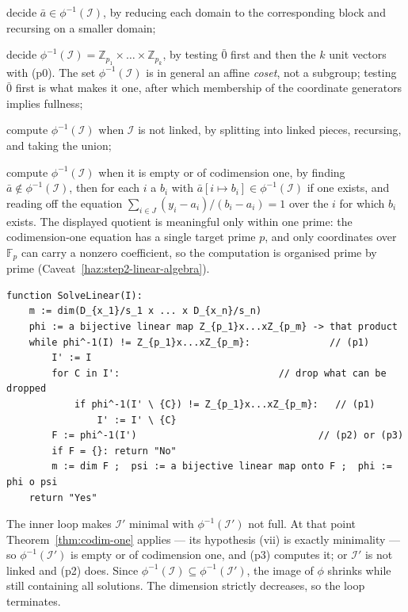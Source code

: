 \begin{description}\tightlist
\item[\textup{(p0)}] decide $\bar a\in\phi^{-1}(\mathcal I)$, by reducing each
  domain to the corresponding block and recursing on a smaller domain;
\item[\textup{(p1)}] decide $\phi^{-1}(\mathcal I)=\mathbb Z_{p_{1}}\times\dots
  \times\mathbb Z_{p_{k}}$, by testing $\bar 0$ first and then the $k$ unit
  vectors with \textup{(p0)}. The set $\phi^{-1}(\mathcal I)$ is in general an
  affine \emph{coset}, not a subgroup; testing $\bar 0$ first is what makes it
  one, after which membership of the coordinate generators implies fullness;
\item[\textup{(p2)}] compute $\phi^{-1}(\mathcal I)$ when $\mathcal I$ is not
  linked, by splitting into linked pieces, recursing, and taking the union;
\item[\textup{(p3)}] compute $\phi^{-1}(\mathcal I)$ when it is empty or of
  codimension one, by finding $\bar a\notin\phi^{-1}(\mathcal I)$, then for each
  $i$ a $b_{i}$ with $\bar a[i\mapsto b_{i}]\in\phi^{-1}(\mathcal I)$ if one
  exists, and reading off the equation
  $\sum_{i\in J}(y_{i}-a_{i})/(b_{i}-a_{i})=1$ over the $i$ for which $b_{i}$
  exists. The displayed quotient is meaningful only within one prime: the
  codimension-one equation has a single target prime $p$, and only coordinates
  over $\mathbb F_{p}$ can carry a nonzero coefficient, so the computation is
  organised prime by prime (Caveat~\ref{haz:step2-linear-algebra}).
\end{description}

\begin{verbatim}
function SolveLinear(I):
    m := dim(D_{x_1}/s_1 x ... x D_{x_n}/s_n)
    phi := a bijective linear map Z_{p_1}x...xZ_{p_m} -> that product
    while phi^-1(I) != Z_{p_1}x...xZ_{p_m}:              // (p1)
        I' := I
        for C in I':                            // drop what can be dropped
            if phi^-1(I' \ {C}) != Z_{p_1}x...xZ_{p_m}:   // (p1)
                I' := I' \ {C}
        F := phi^-1(I')                                // (p2) or (p3)
        if F = {}: return "No"
        m := dim F ;  psi := a bijective linear map onto F ;  phi := phi o psi
    return "Yes"
\end{verbatim}

The inner loop makes $\mathcal I'$ minimal with $\phi^{-1}(\mathcal I')$ not
full. At that point Theorem~\ref{thm:codim-one} applies --- its hypothesis (vii)
is exactly minimality --- so $\phi^{-1}(\mathcal I')$ is empty or of codimension
one, and \textup{(p3)} computes it; or $\mathcal I'$ is not linked and
\textup{(p2)} does. Since $\phi^{-1}(\mathcal I)\subseteq\phi^{-1}(\mathcal I')$,
the image of $\phi$ shrinks while still containing all solutions. The dimension
strictly decreases, so the loop terminates.

